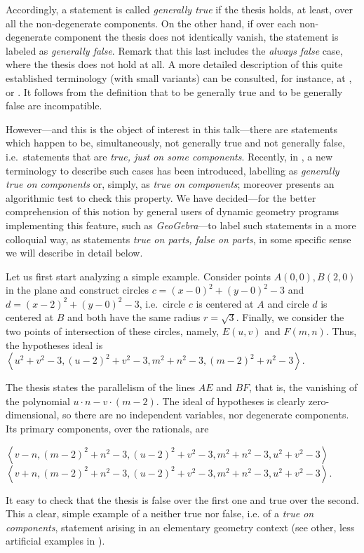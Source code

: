 \documentclass{article}
\begin{document}
 Accordingly,  a statement is called \emph{generally true} if the thesis holds, at least, over all the non-degenerate components. 
On the other hand, if over each non-degenerate component the thesis does not identically vanish, the statement is labeled as \emph{generally false}. Remark that this last includes the \emph{always false} case, where the thesis does not hold at all. A more detailed description of this quite established terminology (with small variants) can be consulted, for instance, at \cite{RV99}, \cite{CLS} or \cite{ZWS}.   It follows from the definition that  to be generally true and to be generally false are incompatible.  

However---and this is the object of interest in this talk---there are statements which happen to be,  simultaneously, not generally true and not generally false, i.e.~statements that are \emph{true, just on some components}. Recently, in \cite{ZWS}, a new terminology to describe such cases  has been introduced, labelling as \emph{generally true on components} or, simply,  as \emph{true on components}; moreover \cite{ZWS} presents an algorithmic test to check this property. We have decided---for the better comprehension of this notion by general users of dynamic geometry programs implementing this feature, such as {\it GeoGebra}---to label such statements in a more colloquial way, as  statements \emph{true on parts, false on parts}, in some specific sense we will describe in detail below. 
 
Let us first start analyzing a simple example. Consider  points $A (0,0), B (2,0)$ in the plane and construct circles $c= (x-0)^2+(y-0)^2-3$ and $d=(x-2)^2+(y-0)^2-3$, i.e.~circle $c$ is centered at $A$ and circle $d$ is centered at $B$ and both have the same radius $r=\sqrt 3$.  Finally, we consider the two points of intersection of these circles, namely, $E (u, v)$ and $F (m, n)$. Thus, the hypotheses ideal is 
 $\left< u^2+v^2-3,(u-2)^2+v^2-3,  m^2+n^2-3, (m-2)^2+n^2-3\right>.$
 
 The thesis states the parallelism of the lines $AE$ and $BF$, that is, the vanishing of the polynomial
 $u\cdot n-v\cdot(m-2).$
 \noindent The ideal of hypotheses is clearly zero-dimensional, so there are no independent variables, nor degenerate components. Its primary components, over the rationals, are
\begin{center}
$\left<v-n, (m-2)^2+n^2-3, (u-2)^2+v^2-3, m^2+n^2-3, u^2+v^2-3\right>$\\
$\left<v+n, (m-2)^2+n^2-3, (u-2)^2+v^2-3, m^2+n^2-3, u^2+v^2-3\right>$.
\end{center}  
  It easy to check that the thesis is false over the first one and true over the second. This a clear, simple example of a neither true nor false, i.e. of a  \emph{true on components}, statement arising in an elementary geometry context (see other, less artificial examples in \cite{RV99,BR}).
  
\end{document}
